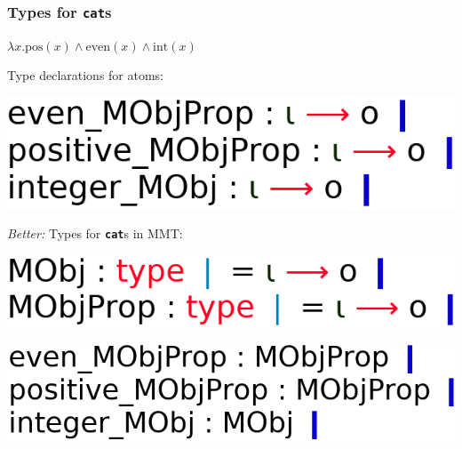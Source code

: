 \documentclass[usenames,dvipsnames,handout]{beamer}
\def\log#1{{\bfseries#1}}              %
\begin{document}
\begin{frame}[fragile]
    \frametitle{Types for \texttt{\bfseries cat}s}
    \log{$\lambda x.\text{pos}(x) \land \text{even}(x) \land \text{int}(x)$}

    \vspace{1.0em}
    Type declarations for atoms:

    \vspace{0.5em}
    \quad\includegraphics[scale=0.2]{figures/naive_type_decls.png}

    \pause
    \vspace{2.0em}
    \emph{Better:} Types for \texttt{\bfseries cat}s in MMT:

    \vspace{0.5em}
    \quad\includegraphics[scale=0.2]{figures/cat_types_example.png}

    \vspace{0.5em}
    \quad\includegraphics[scale=0.2]{figures/cat_types_example_pt2.png}

\end{frame}
\end{document}
